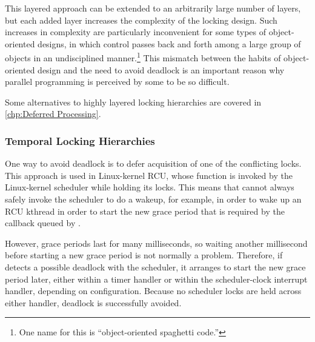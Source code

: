 This layered approach can be extended to an arbitrarily large number of layers,
but each added layer increases the complexity of the locking design.
Such increases in complexity are particularly inconvenient for some
types of object-oriented designs, in which control passes back and forth
among a large group of objects in an undisciplined manner.\footnote{
	One name for this is ``object-oriented spaghetti code.''}
This mismatch between the habits of object-oriented design and the
need to avoid deadlock is an important reason why parallel programming
is perceived by some to be so difficult.

Some alternatives to highly layered locking hierarchies are covered in
\cref{chp:Deferred Processing}.

\subsubsection{Temporal Locking Hierarchies}
\label{sec:locking:Temporal Locking Hierarchies}

One way to avoid deadlock is to defer acquisition of one of the
conflicting locks.
This approach is used in Linux-kernel RCU, whose 
function is invoked by the Linux-kernel scheduler while holding
its locks.
This means that  cannot always safely invoke the scheduler
to do a wakeup, for example, in order to wake up an RCU kthread in order
to start the new grace period that is required by the callback queued
by .

\QuickQuizEnd

However, grace periods last for many milliseconds, so waiting another
millisecond before starting a new grace period is not normally a problem.
Therefore, if  detects a possible deadlock with the
scheduler, it arranges to start the new grace period later, either
within a timer handler or within the scheduler-clock interrupt handler,
depending on configuration.
Because no scheduler locks are held across either handler, deadlock
is successfully avoided.

